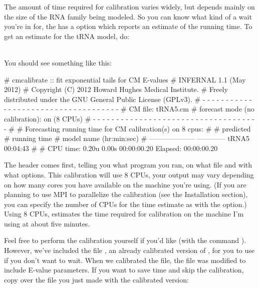The amount of time required for calibration varies widely, but
depends mainly on the size of the RNA family being modeled.
So you can know what kind of a wait you're in for, the
 has a  option which reports an
estimate of the running time. To get an estimate for the tRNA model, do:

\\

You should see something like this:

\begin{sreoutput}
# cmcalibrate :: fit exponential tails for CM E-values
# INFERNAL 1.1 (May 2012)
# Copyright (C) 2012 Howard Hughes Medical Institute.
# Freely distributed under the GNU General Public License (GPLv3).
# - - - - - - - - - - - - - - - - - - - - - - - - - - - - - - - - - - - -
# CM file:                                     tRNA5.cm
# forecast mode (no calibration):              on (8 CPUs)
# - - - - - - - - - - - - - - - - - - - - - - - - - - - - - - - - - - - -
#
# Forecasting running time for CM calibration(s) on 8 cpus:
#
#                          predicted
#                       running time
# model name            (hr:min:sec)
# --------------------  ------------
  tRNA5                     00:04:43
#
# CPU time: 0.20u 0.00s 00:00:00.20 Elapsed: 00:00:00.20
\end{sreoutput}

The header comes first, telling you what program you ran, on what file
and with what options. This calibration will use 8 CPUs, your output
may vary depending on how many cores you have available on the machine
you're using. (If you are planning to use MPI to parallelize the
calibration (see the Installation section), you can specify the number
of CPUs for the time estimate as  with the  option.) Using 8 CPUs,  estimates the time
required for calibration on the machine I'm using at about five
minutes.

Feel free to perform the calibration yourself if you'd like (with the
command ). However, we've included the file
, an already calibrated version of ,
for you to use if you don't want to wait. When we calibrated the
 file, the file was modified to include E-value
parameters. If you want to save time and skip the calibration, 
copy over the  file you just made with the calibrated
version:
 
